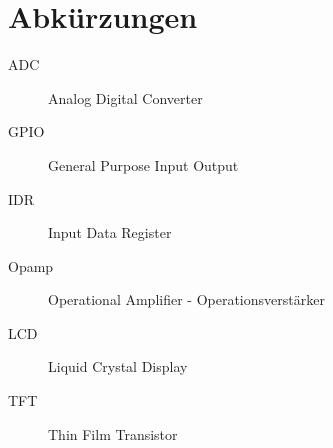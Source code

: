 \documentclass[a4paper,11pt,titlepage]{article}
\begin{document}


\tableofcontents
\thispagestyle{empty}
\clearpage

\setcounter{page}{3}
\section*{Abkürzungen}
\begin{description}
	\item[ADC]
	Analog Digital Converter
	
	\item[GPIO]
	General Purpose Input Output

	\item[IDR]
	Input Data Register
	
	\item[Opamp]
	Operational Amplifier - Operationsverstärker

	\item[LCD]
	Liquid Crystal Display

	\item[TFT]
	Thin Film Transistor
\end{description}
\clearpage

\setcounter{page}{1}

















\end{document}
